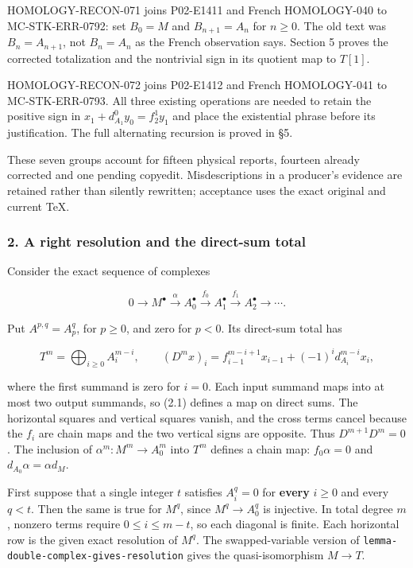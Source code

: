 HOMOLOGY-RECON-071 joins P02-E1411 and French HOMOLOGY-040 to MC-STK-ERR-0792: set \(B_0=M\) and \(B_{n+1}=A_n\) for \(n\geq0\). The old text was \(B_n=A_{n+1}\), not \(B_n=A_n\) as the French observation says. Section 5 proves the corrected totalization and the nontrivial sign in its quotient map to \(T[1]\).

HOMOLOGY-RECON-072 joins P02-E1412 and French HOMOLOGY-041 to MC-STK-ERR-0793. All three existing operations are needed to retain the positive sign in \(x_1+d_{A_1}^0y_0=f_2^1y_1\) and place the existential phrase before its justification. The full alternating recursion is proved in §5.

These seven groups account for fifteen physical reports, fourteen already corrected and one pending copyedit. Misdescriptions in a producer's evidence are retained rather than silently rewritten; acceptance uses the exact original and current TeX.

\subsubsection{2. A right resolution and the direct-sum total}\label{a-right-resolution-and-the-direct-sum-total}

Consider the exact sequence of complexes

\[
0\longrightarrow M^\bullet\xrightarrow{\alpha}A_0^\bullet
\xrightarrow{f_0}A_1^\bullet\xrightarrow{f_1}A_2^\bullet
\longrightarrow\cdots.
\]

Put \(A^{p,q}=A_p^q\), for \(p\geq0\), and zero for \(p<0\). Its direct-sum total has

\[
T^m=\bigoplus_{i\geq0}A_i^{m-i},\qquad
(D^mx)_i=f_{i-1}^{m-i+1}x_{i-1}+(-1)^i d_{A_i}^{m-i}x_i,       \tag{2.1}
\]

where the first summand is zero for \(i=0\). Each input summand maps into at most two output summands, so (2.1) defines a map on direct sums. The horizontal squares and vertical squares vanish, and the cross terms cancel because the \(f_i\) are chain maps and the two vertical signs are opposite. Thus \(D^{m+1}D^m=0\). The inclusion of \(\alpha^m:M^m\to A_0^m\) into \(T^m\) defines a chain map: \(f_0\alpha=0\) and \(d_{A_0}\alpha=\alpha d_M\).

First suppose that a single integer \(t\) satisfies \(A_i^q=0\) for \textbf{every} \(i\geq0\) and every \(q<t\). Then the same is true for \(M^q\), since \(M^q\to A_0^q\) is injective. In total degree \(m\), nonzero terms require \(0\leq i\leq m-t\), so each diagonal is finite. Each horizontal row is the given exact resolution of \(M^q\). The swapped-variable version of \texttt{lemma-double-complex-gives-resolution} gives the quasi-isomorphism \(M\to T\).

